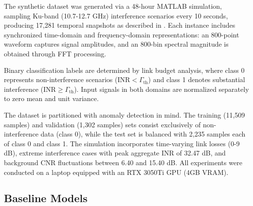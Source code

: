 \documentclass[conference]{IEEEtran}
\begin{document}
The synthetic dataset was generated via a 48-hour MATLAB simulation, sampling Ku-band (10.7-12.7 GHz) interference scenarios every 10 seconds, producing 17,281 temporal snapshots as described in \cite{saifaldawlaGenAIBasedModelsNGSO2024}. Each instance includes synchronized time-domain and frequency-domain representations: an 800-point waveform captures signal amplitudes, and an 800-bin spectral magnitude is obtained through FFT processing.

Binary classification labels are determined by link budget analysis, where class 0 represents non-interference scenarios ($\text{INR} < \Gamma_{\text{th}}$) and class 1 denotes substantial interference ($\text{INR} \geq \Gamma_{\text{th}}$). Input signals in both domains are normalized separately to zero mean and unit variance.

The dataset is partitioned with anomaly detection in mind. The training (11,509 samples) and validation (1,302 samples) sets consist exclusively of non-interference data (class 0), while the test set is balanced with 2,235 samples each of class 0 and class 1. The simulation incorporates time-varying link losses (0-9 dB), extreme interference cases with peak aggregate INR of 32.47 dB, and background CNR fluctuations between 6.40 and 15.40 dB. All experiments were conducted on a laptop equipped with an RTX 3050Ti GPU (4GB VRAM).




\subsection{Baseline Models}
\end{document}
